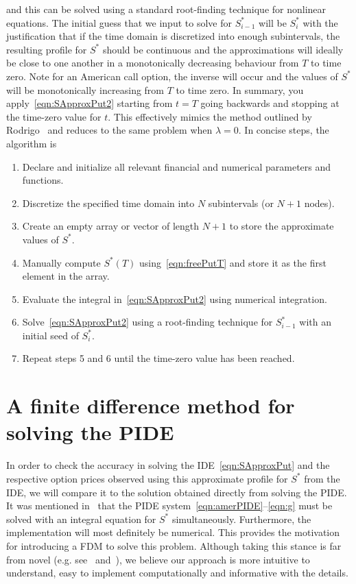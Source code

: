 and this can be solved using a standard root-finding technique for nonlinear equations. The initial guess that we input to solve for $S^*_{i-1}$ will be $S^*_{i}$ with the justification that if the time domain is discretized into enough subintervals, the resulting profile for $S^*$ should be continuous and the approximations will ideally be close to one another in a monotonically decreasing behaviour from $T$ to time zero. Note for an American call option, the inverse will occur and the values of $S^*$ will be monotonically increasing from $T$ to time zero. In summary, you apply~\eqref{eqn:SApproxPut2} starting from $t=T$ going backwards and stopping at the time-zero value for $t$. This effectively mimics the method outlined by Rodrigo~\cite{Rodrigo2013} and reduces to the same problem when $\lambda = 0$. In concise steps, the algorithm is
	\begin{enumerate}
		\item Declare and initialize all relevant financial and numerical parameters and functions.
		\item Discretize the specified time domain into $N$ subintervals (or $N+1$ nodes).
		\item Create an empty array or vector of length $N+1$ to store the approximate values of $S^*$.
		\item Manually compute $S^*(T)$ using~\eqref{eqn:freePutT} and store it as the first element in the array.
		\item Evaluate the integral in~\eqref{eqn:SApproxPut2} using numerical integration.
		\item Solve~\eqref{eqn:SApproxPut2} using a root-finding technique for $S^*_{i-1}$ with an initial seed of $S^*_{i}$.
		\item Repeat steps 5 and 6 until the time-zero value has been reached.
	\end{enumerate}

\section{A finite difference method for solving the PIDE}
In order to check the accuracy in solving the IDE~\eqref{eqn:SApproxPut} and the respective option prices observed using this approximate profile for $S^*$ from the IDE, we will compare it to the solution obtained directly from solving the PIDE. It was mentioned in~\cite{Chiarella2014} that the PIDE system~\eqref{eqn:amerPIDE}--\eqref{eqn:g} must be solved with an integral equation for $S^*$ simultaneously. Furthermore, the implementation will most definitely be numerical. This provides the motivation for introducing a FDM to solve this problem. Although taking this stance is far from novel (e.g. see~\cite{Cont2004} and~\cite{Tavella2000}), we believe our approach is more intuitive to understand, easy to implement computationally and informative with the details.

